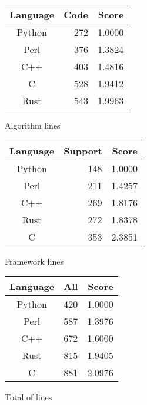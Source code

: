 \begin{subtable}{0.33\textwidth}
    \centering
    \begin{tabular}{|c|r|r|}
        \hline
        Language & Code & Score \\
        \hline
        Python & 272 & 1.0000 \\
        Perl & 376 & 1.3824 \\
        C++ & 403 & 1.4816 \\
        C & 528 & 1.9412 \\
        Rust & 543 & 1.9963 \\
        \hline
    \end{tabular}
    \caption{Algorithm lines}
    \label{table:sloc:algorithm}
\end{subtable}%
\begin{subtable}{0.33\textwidth}
    \centering
    \begin{tabular}{|c|r|r|}
        \hline
        Language & Support & Score \\
        \hline
        Python & 148 & 1.0000 \\
        Perl & 211 & 1.4257 \\
        C++ & 269 & 1.8176 \\
        Rust & 272 & 1.8378 \\
        C & 353 & 2.3851 \\
        \hline
    \end{tabular}
    \caption{Framework lines}
    \label{table:sloc:framework}
\end{subtable}%
\begin{subtable}{0.33\textwidth}
    \centering
    \begin{tabular}{|c|r|r|}
        \hline
        Language & All & Score \\
        \hline
        Python & 420 & 1.0000 \\
        Perl & 587 & 1.3976 \\
        C++ & 672 & 1.6000 \\
        Rust & 815 & 1.9405 \\
        C & 881 & 2.0976 \\
        \hline
    \end{tabular}
    \caption{Total of lines}
    \label{table:sloc:all}
\end{subtable}
